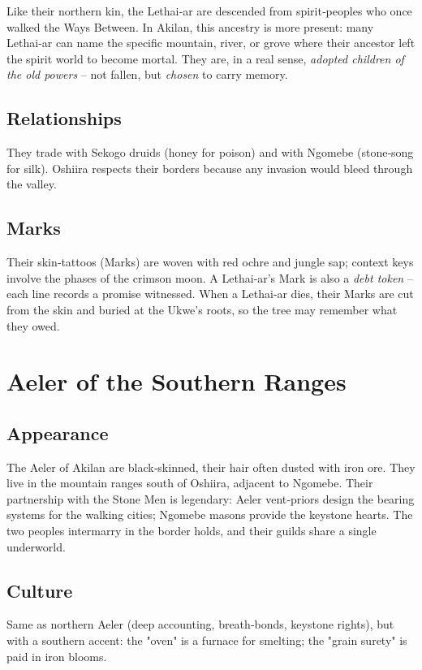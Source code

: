 \documentclass[11pt]{book}
\begin{document}
Like their northern kin, the Lethai‑ar are descended from spirit‑peoples who once walked the Ways Between. In Akilan, this ancestry is more present: many Lethai‑ar can name the specific mountain, river, or grove where their ancestor left the spirit world to become mortal. They are, in a real sense, \textit{adopted children of the old powers} -- not fallen, but \textit{chosen} to carry memory.

\subsection*{Relationships}
They trade with Sekogo druids (honey for poison) and with Ngomebe (stone‑song for silk). Oshiira respects their borders because any invasion would bleed through the valley.

\subsection*{Marks}
Their skin‑tattoos (Marks) are woven with red ochre and jungle sap; context keys involve the phases of the crimson moon. A Lethai‑ar's Mark is also a \textit{debt token} -- each line records a promise witnessed. When a Lethai‑ar dies, their Marks are cut from the skin and buried at the Ukwe's roots, so the tree may remember what they owed.

\section{Aeler of the Southern Ranges}

\subsection*{Appearance}
The Aeler of Akilan are black‑skinned, their hair often dusted with iron ore. They live in the mountain ranges south of Oshiira, adjacent to Ngomebe. Their partnership with the Stone Men is legendary: Aeler vent‑priors design the bearing systems for the walking cities; Ngomebe masons provide the keystone hearts. The two peoples intermarry in the border holds, and their guilds share a single underworld.

\subsection*{Culture}
Same as northern Aeler (deep accounting, breath‑bonds, keystone rights), but with a southern accent: the "oven" is a furnace for smelting; the "grain surety" is paid in iron blooms.
\end{document}
